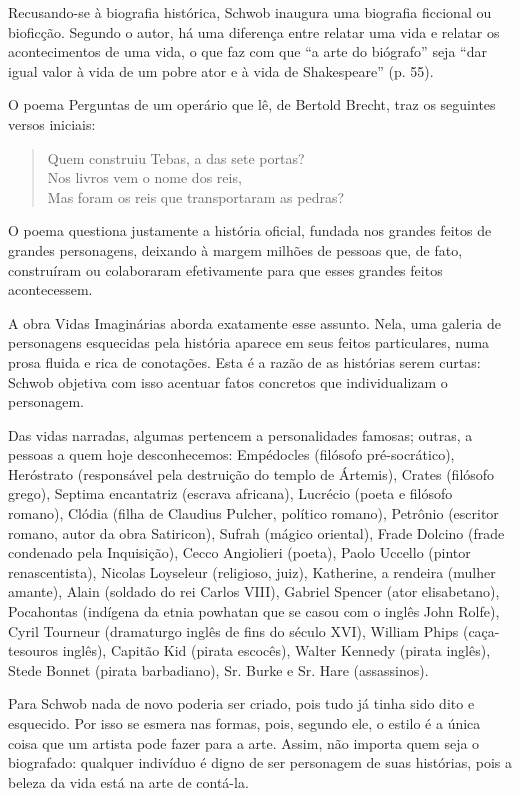 \documentclass[12pt]{extarticle}
\begin{document}
Recusando-se à biografia histórica, Schwob inaugura uma biografia
ficcional ou bioficção. Segundo o autor, há uma diferença entre relatar
uma vida e relatar os acontecimentos de uma vida, o que faz com que ``a
arte do biógrafo'' seja ``dar igual valor à vida de um pobre ator e à
vida de Shakespeare'' (p. 55).

O poema Perguntas de um operário que lê, de Bertold Brecht, traz os
seguintes versos iniciais:

\begin{verse}
Quem construiu Tebas, a das sete portas?\\
Nos livros vem o nome dos reis,\\
Mas foram os reis que transportaram as pedras?\\
\end{verse}

O poema questiona justamente a história oficial, fundada nos grandes
feitos de grandes personagens, deixando à margem milhões de pessoas que,
de fato, construíram ou colaboraram efetivamente para que esses grandes
feitos acontecessem.

A obra Vidas Imaginárias aborda exatamente esse assunto. Nela, uma
galeria de personagens esquecidas pela história aparece em seus feitos
particulares, numa prosa fluida e rica de conotações. Esta é a razão de
as histórias serem curtas: Schwob objetiva com isso acentuar fatos
concretos que individualizam o personagem.

Das vidas narradas, algumas pertencem a personalidades famosas; outras,
a pessoas a quem hoje desconhecemos: Empédocles (filósofo
pré-socrático), Heróstrato (responsável pela destruição do templo de
Ártemis), Crates (filósofo grego), Septima encantatriz (escrava
africana), Lucrécio (poeta e filósofo romano), Clódia (filha de Claudius
Pulcher, político romano), Petrônio (escritor romano, autor da obra
Satiricon), Sufrah (mágico oriental), Frade Dolcino (frade condenado
pela Inquisição), Cecco Angiolieri (poeta), Paolo Uccello (pintor
renascentista), Nicolas Loyseleur (religioso, juiz), Katherine, a
rendeira (mulher amante), Alain (soldado do rei Carlos VIII), Gabriel
Spencer (ator elisabetano), Pocahontas (indígena da etnia powhatan que
se casou com o inglês John Rolfe), Cyril Tourneur (dramaturgo inglês de
fins do século XVI), William Phips (caça-tesouros inglês), Capitão Kid
(pirata escocês), Walter Kennedy (pirata inglês), Stede Bonnet (pirata
barbadiano), Sr. Burke e Sr. Hare (assassinos).

Para Schwob nada de novo poderia ser criado, pois tudo já tinha sido
dito e esquecido. Por isso se esmera nas formas, pois, segundo ele, o
estilo é a única coisa que um artista pode fazer para a arte. Assim, não
importa quem seja o biografado: qualquer indivíduo é digno de ser
personagem de suas histórias, pois a beleza da vida está na arte de
contá-la.
\end{document}
